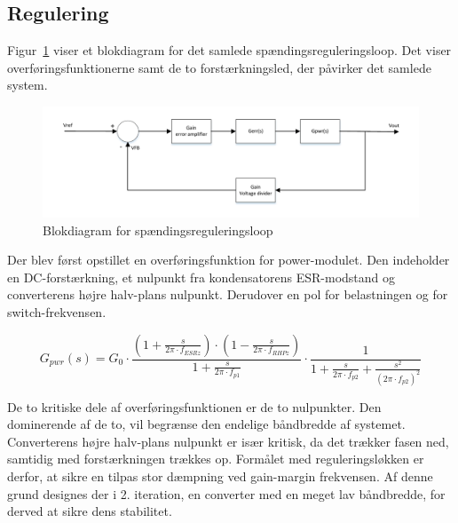 
\subsection{Regulering}
Figur~\ref{fig:blokdiagram_regulering} viser et blokdiagram for det samlede spændingsreguleringsloop. Det viser overføringsfunktionerne samt de to forstærkningsled, der påvirker det samlede system.

\begin{figure}[H]
	\centering
	\includegraphics[width=1\linewidth]{../Dokumentation/tex/2iteration/billeder/Regulerings_blokdiagram.pdf}
	\caption{Blokdiagram for spændingsreguleringsloop}
	\label{fig:blokdiagram_regulering}
\end{figure}

\noindent Der blev først opstillet en overføringsfunktion for power-modulet\cite{UCC1801}. Den indeholder en DC-forstærkning, et nulpunkt fra kondensatorens ESR-modstand og converterens højre halv-plans nulpunkt. Derudover en pol for belastningen og for switch-frekvensen. 

\begin{equation} \label{H_Power}
G_{pwr}(s) = G_0 \cdot \frac{(1+\frac{s}{2\pi \cdot f_{ESRz}}) \cdot (1-\frac{s}{2\pi \cdot f_{RHPz}})}{1+\frac{s}{2\pi \cdot f_{p1}}} \cdot \frac{1}{1 + \frac{s}{2\pi \cdot f_{p2}} + \frac{s^2}{(2\pi \cdot f_{p2})^2}}
\end{equation}

De to kritiske dele af overføringsfunktionen er de to nulpunkter. Den dominerende af de to, vil begrænse den endelige båndbredde af systemet. Converterens højre halv-plans nulpunkt er især kritisk, da det trækker fasen ned, samtidig med forstærkningen trækkes op. Formålet med reguleringsløkken er derfor, at sikre en tilpas stor dæmpning ved gain-margin frekvensen. Af denne grund designes der i 2. iteration, en converter med en meget lav båndbredde, for derved at sikre dens stabilitet.

